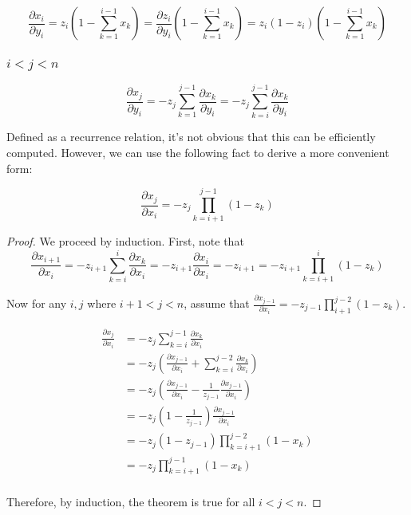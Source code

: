 \documentclass{article}
\begin{document}
$$\frac{\partial x_i}{\partial y_i} = z_i \left( 1 - \sum_{k=1}^{i-1} x_k \right) =
\frac{\partial z_i}{\partial y_i} \left( 1 - \sum_{k=1}^{i-1} x_k \right) =
z_i (1 - z_i) \left( 1 - \sum_{k=1}^{i-1} x_k \right)$$

\subsubsection{$i < j < n$}

$$\frac{\partial x_j}{\partial y_i} =  - z_j \sum_{k=1}^{j-1}
\frac{\partial x_k}{\partial y_i} =
-z_j \sum_{k=i}^{j-1}
\frac{\partial x_k}{\partial y_i}
$$

Defined as a recurrence relation, it's not obvious that this can be efficiently
computed. However, we can use the following fact to derive a more convenient
form:

\begin{equation}
\frac{\partial x_j}{\partial x_i} = -z_j \prod_{k=i+1}^{j-1} (1 - z_k)
\end{equation}

\begin{proof}
We proceed by induction. First, note that $$
\frac{\partial x_{i+1}}{\partial x_i}
= -z_{i+1} \sum_{k=i}^{i}\frac{\partial x_k}{\partial x_i}
= -z_{i+1} \frac{\partial{x_i}}{\partial x_i}
= -z_{i+1}
= -z_{i+1} \prod_{k=i+1}^{i} (1 - z_k)
$$

Now for any $i, j$ where $i + 1 < j < n$, assume that $\frac{\partial
x_{j-1}}{\partial x_i} =
-z_{j-1} \prod_{i+1}^{j-2} (1 - z_k)$.

\begin{align*}
\frac{\partial x_j}{\partial x_i} &= -z_j \sum_{k=i}^{j-1} \frac{\partial
x_k}{\partial x_i} \\
&= -z_j \left( \frac{\partial x_{j-1}}{\partial x_i} + \sum_{k=i}^{j-2} \frac{\partial
x_k}{\partial x_i} \right) \\
&= -z_j \left( \frac{\partial x_{j-1}}{\partial x_i} - \frac{1}{z_{j-1}} \frac{\partial
x_{j-1}}{\partial x_i} \right) \\
&= -z_j \left( 1 - \frac{1}{z_{j-1}} \right) \frac{\partial x_{j-1}}{\partial
x_i} \\
&= -z_j ( 1 - z_{j-1} ) \prod_{k=i+1}^{j-2} (1-x_k) \\
&= -z_j \prod_{k=i+1}^{j-1} (1-x_k) \\
\end{align*}

Therefore, by induction, the theorem is true for all $i < j < n$.

\end{proof}
\end{document}
